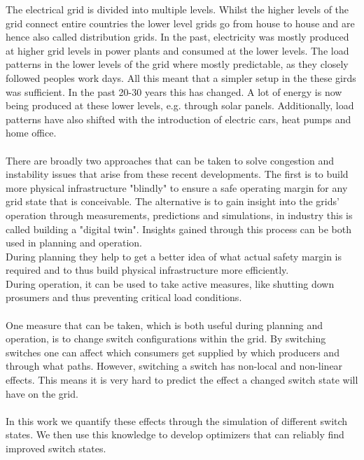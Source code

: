 The electrical grid is divided into multiple levels. 
Whilst the higher levels of the grid connect
entire countries the lower level grids go from house
to house and are hence also called 
distribution grids. In the past, electricity
was mostly produced at higher grid levels in power plants
and consumed at the lower levels. The load patterns in
the lower levels of the grid where
mostly predictable, as they closely followed peoples
work days. All this meant that a simpler setup
in the these girds was sufficient. In the past 20-30 years
this has changed. A lot of energy is now
being produced at these lower levels, e.g. through solar
panels. Additionally, load patterns have also shifted
with the introduction of electric cars,
heat pumps and home office\autocite{venios}.\\
\\
There are broadly two approaches that can be taken to solve congestion and instability 
issues that arise from these recent developments. The first is to build more
physical infrastructure "blindly" to
ensure a safe operating margin for any grid state that is conceivable. 
The alternative is to gain insight into the grids' operation through measurements,
predictions and simulations, in industry this is called building a "digital twin".
Insights gained through this process can be both used in planning and operation.\\
During planning they help to get a better idea of what actual safety margin
is required and to thus build physical infrastructure more efficiently.\\
During operation, it can be
used to take active measures, like shutting down prosumers and 
thus preventing critical load conditions.\\
\\
One measure that can be taken, which is both useful during planning and operation, is to
change switch configurations within the grid. By switching switches one
can affect which consumers get supplied by which producers and through what
paths. However, switching a switch has non-local and non-linear effects.
This means it is very hard to predict the effect a changed switch state
will have on the grid. \\
\\
In this work we quantify these effects through the simulation of
different switch states.
We then use this knowledge to develop optimizers that can reliably
find improved switch states.
